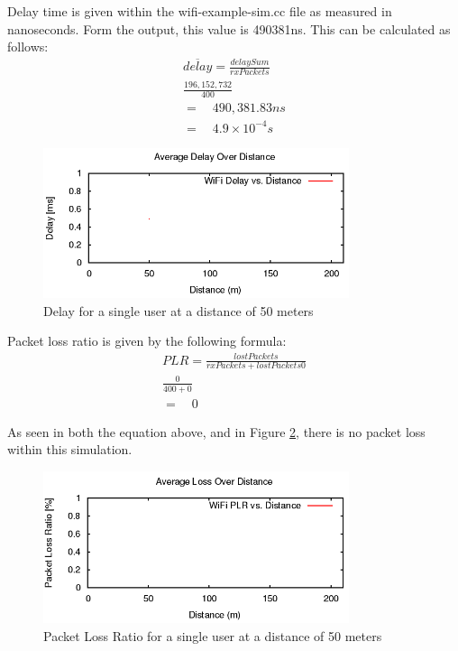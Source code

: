 \par Delay time is given within the wifi-example-sim.cc file as measured in
nanoseconds. Form the output, this value is 490381ns. This can be calculated as
follows:
\begin{gather*}
	\overline{delay}=\frac{delaySum}{rxPackets} \\
	\frac{196,152,732}{400} \\
	= \quad 490,381.83ns \\
	= \quad 4.9\times10^{-4}s
\end{gather*}

\begin{figure}[H]
	\centering
	\includegraphics[width=0.8\textwidth]{images/EE500/QA/P1/Images/wifi-Delay}
	\caption{Delay for a single user at a distance of 50 meters}
	\label{fig:QAdelay}
\end{figure}


Packet loss ratio is given by the following formula:
\begin{gather*}
	PLR = \frac{lostPackets}{rxPackets+lostPackets0} \\
	\frac{0}{400+0} \\
	= \quad 0
\end{gather*}

As seen in both the equation above, and in Figure \ref{fig:QALoss}, there is no
packet loss within this simulation.

\begin{figure}[H]
	\centering
	\includegraphics[width=0.8\textwidth]{images/EE500/QA/P1/Images/wifi-loss}
	\caption{Packet Loss Ratio for a single user at a distance of 50 meters}
	\label{fig:QALoss}
\end{figure}
